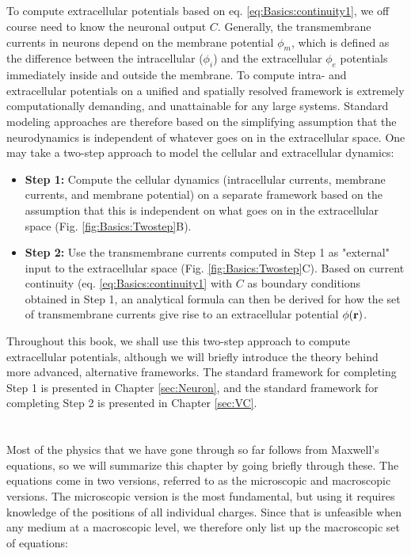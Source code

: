\subsection{}
\label{sec:Basics:twostep}
To compute extracellular potentials based on eq. \ref{eq:Basics:continuity1}, we off course need to know the neuronal output $C$. Generally, the transmembrane currents in neurons depend on the membrane potential $\phi_m$, which is defined as the difference between the intracellular ($\phi_i$) and the extracellular $\phi_e$ potentials immediately inside and outside the membrane. To compute intra- and extracellular potentials on a unified and spatially resolved framework is extremely computationally demanding, and unattainable for any large systems. Standard modeling approaches are therefore based on the simplifying assumption that the neurodynamics is independent of whatever goes on in the extracellular space. One may take a two-step approach to model the cellular and extracellular dynamics: 

\begin{itemize}
\item {\bf Step 1:} Compute the cellular dynamics (intracellular currents, membrane currents, and membrane potential) on a separate framework based on the assumption that this is independent on what goes on in the extracellular space (Fig. \ref{fig:Basics:Twostep}B). 

\item {\bf Step 2:} Use the transmembrane currents computed in Step 1 as "external" input to the extracellular space (Fig. \ref{fig:Basics:Twostep}C). Based on current continuity (eq. \ref{eq:Basics:continuity1} with $C$ as boundary conditions obtained in Step 1, an analytical formula can then be derived for how the set of transmembrane currents give rise to an extracellular potential $\phi({\bf r})$. 
\end{itemize}

Throughout this book, we shall use this two-step approach to compute extracellular potentials, although we will briefly introduce the theory behind more advanced, alternative frameworks. The standard framework for completing Step 1 is presented in Chapter \ref{sec:Neuron}, and the standard framework for completing Step 2 is presented in Chapter \ref{sec:VC}. 



\section{}
\label{sec:Basics:Maxwell} 
Most of the physics that we have gone through so far follows from Maxwell's equations, so we will summarize this chapter by going briefly through these. The equations come in two versions, referred to as the microscopic and macroscopic versions. The microscopic version is the most fundamental, but using it requires knowledge of the positions of all individual charges. Since that is unfeasible when any medium at a macroscopic level, we therefore only list up the macroscopic set of equations: 

